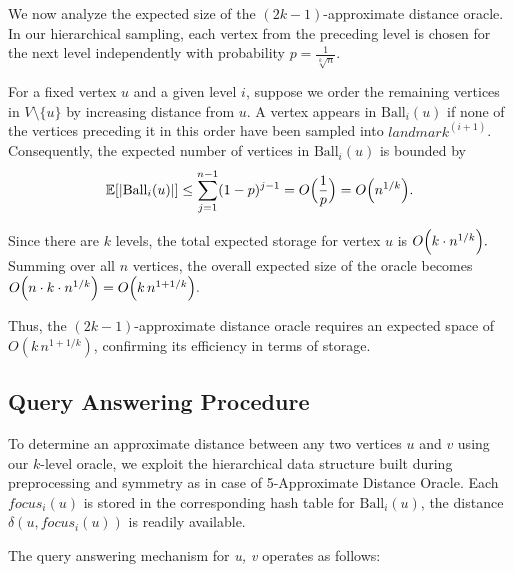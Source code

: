 \documentclass{article}
\begin{document}
We now analyze the expected size of the \((2k-1)\)-approximate distance oracle.  In our hierarchical sampling, each vertex from the preceding level is chosen for the next level independently with probability 
\(
p = \frac{1}{\sqrt[k]{n}}.
\)

For a fixed vertex \(u\) and a given level \(i\), suppose we order the remaining vertices in \(V \setminus \{u\}\) by increasing distance from \(u\). A vertex appears in \(\text{Ball}_i(u)\) if none of the vertices preceding it in this order have been sampled into \(landmark^{(i+1)}\). Consequently, the expected number of vertices in \(\text{Ball}_i(u)\) is bounded by
\[
\mathbb{E}[|\text{Ball}_i(u)|] \le \sum_{j=1}^{n-1}(1-p)^{j-1} = O\Bigl(\frac{1}{p}\Bigr) = O\Bigl(n^{1/k}\Bigr).
\]

Since there are \(k\) levels, the total expected storage for vertex \(u\) is
\(
O\Bigl(k \cdot n^{1/k}\Bigr).
\)\\
Summing over all \(n\) vertices, the overall expected size of the oracle becomes
\(
O\Bigl(n \cdot k \cdot n^{1/k}\Bigr) = O\Bigl(k\, n^{1+1/k}\Bigr).
\)

Thus, the \((2k-1)\)-approximate distance oracle requires an expected space of \(O(k\, n^{1+1/k})\), confirming its efficiency in terms of storage.

\subsection{Query Answering Procedure}

To determine an approximate distance between any two vertices \(u\) and \(v\) using our \(k\)-level oracle, we exploit the hierarchical data structure built during preprocessing and symmetry as in case of 5-Approximate Distance Oracle. Each \(focus_i(u)\) is stored in the corresponding hash table for \(\text{Ball}_i(u)\), the distance \(\delta(u,focus_i(u))\) is readily available.

The query answering mechanism for \textit{u, v} operates as follows:
\end{document}
